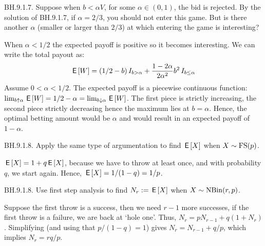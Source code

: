 \begin{exercise}
  BH.9.1.7. Suppose when $b<\alpha V$, for some $\alpha\in(0,1)$, the bid is rejected.
By the solution of BH.9.1.7, if $\alpha=2/3$, you should not enter this game.
But is there another $\alpha$ (smaller or larger than $2/3$) at which entering the game is interesting?
\begin{solution}
  When $\alpha < 1/2$ the expected payoff is positive so it becomes interesting. We can write the total payout as:
 \begin{align*}
   \,\mathsf{E}\left[W\right] &= (1/2 - b) \,I_{b>\alpha} + \frac{1-2\alpha}{2\alpha^2}b^2 \,I_{b\leq \alpha} \\
  \end{align*}
  Assume $0<\alpha<1/2$. The expected payoff is a piecewise continuous function: $\lim_{b\uparrow \alpha} \,\mathsf{E}\left[W\right]  = 1/2 - \alpha = \lim_{b\downarrow \alpha} \,\mathsf{E}\left[W\right]$. The first piece is strictly increasing, the second piece strictly decreasing hence the maximum lies at $b=\alpha$. 
  Hence, the optimal betting amount would be $\alpha$ and would result in an expected payoff of $1-\alpha$. 
\end{solution}
\end{exercise}

\begin{exercise}
BH.9.1.8. Apply the same type of argumentation to find $\,\mathsf{E}\left[X\right]$ when $X\sim \mathrm{FS}(p)$.
\begin{solution}
$\,\mathsf{E}\left[X\right] = 1 + q\,\mathsf{E}\left[X\right]$, because we have to throw at least once, and with probability $q$, we start again. Hence, $\,\mathsf{E}\left[X\right] = 1/(1-q) = 1/p$.
\end{solution}
\end{exercise}

\begin{exercise}
BH.9.1.8. Use first step analysis to  find $N_{r} := \,\mathsf{E}\left[X\right]$ when $X\sim \mathrm{NBin}(r,p)$.
\begin{solution}
Suppose the first throw is a success, then we need $r-1$ more successes, if the first throw is a failure, we are back at `hole one'. Thus, $N_{r} = p N_{r-1}+q(1+N_{r})$. Simplifying (and using that $p/(1-q)=1$) gives $N_{r} = N_{r-1} + q/p$, which implies $N_{r} = r q/p$.
\end{solution}
\end{exercise}

